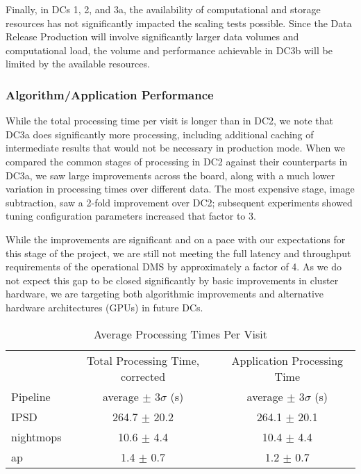 Finally, in DCs 1, 2, and 3a, the availability of computational and storage resources has not
significantly impacted the scaling tests possible.  Since the Data Release Production will 
involve significantly larger data volumes and computational load, the volume
and performance achievable in DC3b will be limited by the available resources.

\subsubsection*{Algorithm/Application Performance}

While the total processing time per
visit is longer than in DC2, we note that DC3a does significantly more processing,
including additional caching of intermediate results that would not be
necessary in production mode.  When we compared the common stages of
processing in DC2 against their counterparts in DC3a, we saw large improvements across the
board, along with a much lower variation in processing times over
different data.  The most expensive stage, image subtraction, saw a
2-fold improvement over DC2; subsequent experiments showed tuning
configuration parameters increased that factor to 3.

While the improvements are significant and on a pace 
with our expectations for this stage of the project, 
we are still not meeting the full latency and throughput
requirements of the operational DMS by approximately a factor of 4.  As we do not expect 
this gap to be closed significantly by basic improvements in cluster hardware, 
we are targeting both algorithmic
improvements and alternative hardware architectures (GPUs) in future DCs.

\begin{table}[ht]
\begin{center}
\caption{Average Processing Times Per Visit
\label{ex:tbl:visitstats}}
\vspace{\baselineskip}
\begin{tabular}{ l | c | c }
\hline\hline
          & Total Processing Time, corrected
          & Application Processing Time \\ 
Pipeline  & average $\pm$  $3\sigma$ (s) & average $\pm$ $3\sigma$ (s) \\ \hline
IPSD      & 264.7 $\pm$ 20.2 & 264.1 $\pm$ 20.1  \\ 
nightmops & 10.6  $\pm$  4.4 & 10.4 $\pm$  4.4  \\ 
ap        & 1.4   $\pm$  0.7 & 1.2 $\pm$  0.7  \\ \hline
\hline
\end{tabular}

\end{center}
\end{table}

